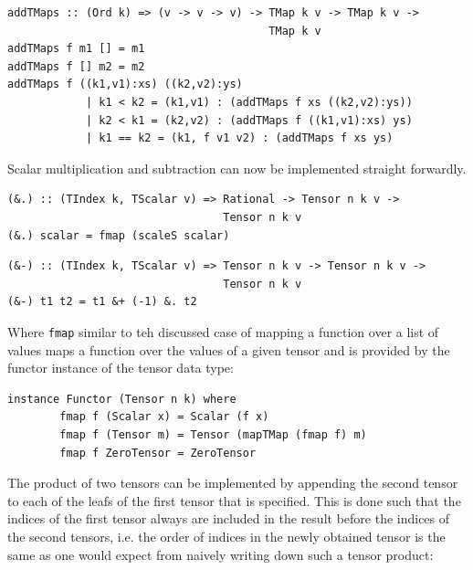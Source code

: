 \documentclass[a4paper,12pt, DIV=14, BCOR=5mm, twoside, headsepline]{scrbook}
\begin{document}
\begin{samepage} 
\begin{verbatim}
addTMaps :: (Ord k) => (v -> v -> v) -> TMap k v -> TMap k v ->
                                        TMap k v 
addTMaps f m1 [] = m1 
addTMaps f [] m2 = m2 
addTMaps f ((k1,v1):xs) ((k2,v2):ys) 
            | k1 < k2 = (k1,v1) : (addTMaps f xs ((k2,v2):ys))
            | k2 < k1 = (k2,v2) : (addTMaps f ((k1,v1):xs) ys)
            | k1 == k2 = (k1, f v1 v2) : (addTMaps f xs ys) 
\end{verbatim} 
\end{samepage}

Scalar multiplication and subtraction can now be implemented straight forwardly.

\begin{samepage} 
\begin{verbatim}
(&.) :: (TIndex k, TScalar v) => Rational -> Tensor n k v ->
                                 Tensor n k v 
(&.) scalar = fmap (scaleS scalar)
\end{verbatim} 
\end{samepage}

\begin{samepage} 
\begin{verbatim}
(&-) :: (TIndex k, TScalar v) => Tensor n k v -> Tensor n k v ->
                                 Tensor n k v
(&-) t1 t2 = t1 &+ (-1) &. t2 
\end{verbatim} 
\end{samepage}

Where \texttt{fmap} similar to teh discussed case of mapping a function over a list of values maps a function over the values of a given tensor and is provided by the functor instance of the tensor data type:

\begin{samepage} 
\begin{verbatim}
instance Functor (Tensor n k) where 
        fmap f (Scalar x) = Scalar (f x)
        fmap f (Tensor m) = Tensor (mapTMap (fmap f) m)
        fmap f ZeroTensor = ZeroTensor 
\end{verbatim} 
\end{samepage}

The product of two tensors can be implemented by appending the second tensor to each of the leafs of the first tensor that is specified. This is done such that the indices of the first tensor always are included in the result before the indices of the second tensors, i.e. the order of indices in the newly obtained tensor is the same as one would expect from naively writing down such a tensor product:
\end{document}

